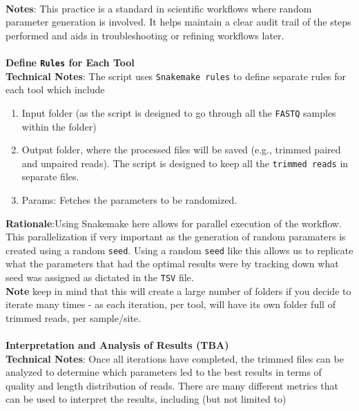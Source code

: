 \documentclass[11pt]{report}
\begin{document}
\\ \textbf{Notes}: This practice is a standard in scientific workflows where random parameter generation is involved. It helps maintain a clear audit trail of the steps performed and aids in troubleshooting or refining workflows later.
  \\
\\ 
\textbf{Define \texttt{Rules} for Each Tool}
\\ \textbf{Technical Notes}: The script uses \texttt{Snakemake rules} to define separate rules for each tool which include
	\begin{enumerate}
		\item Input folder (as the script is designed to go through all the \texttt{FASTQ} samples within the folder)
		\item Output folder, where the processed files will be saved (e.g., trimmed paired and unpaired reads). The script is designed to keep all the \texttt{trimmed reads} in separate files. 
		\item Params: Fetches the parameters to be randomized. 
	\end{enumerate} 
\textbf{Rationale}:Using Snakemake here allows for parallel execution of the workflow. This parallelization if very important as the generation of random paramaters is created using a random \texttt{seed}. Using a random \texttt{seed} like this allows us to replicate what the parameters that had the optimal results were by tracking down what seed was assigned as dictated in the \texttt{TSV} file.\\
\textbf{Note} keep in mind that this will create a large number of folders if you decide to iterate many times - as each iteration, per tool, will have its own folder full of trimmed reads, per sample/site.
  \\
\\ 
\textbf{Interpretation and Analysis of Results (TBA)}
\\ \textbf{Technical Notes}: Once all iterations have completed, the trimmed files can be analyzed to determine which parameters led to the best results in terms of quality and length distribution of reads. There are many different metrics that can be used to interpret the results, including (but not limited to)
\end{document}

